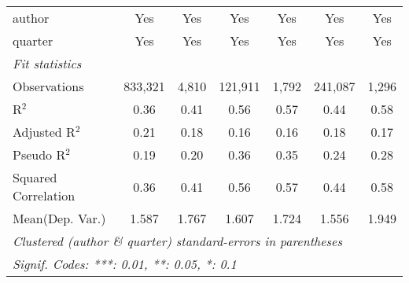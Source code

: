\begin{tabular}{lcccccc}
   author                                                     & Yes            & Yes           & Yes          & Yes         & Yes            & Yes\\  
   quarter                                                    & Yes            & Yes           & Yes          & Yes         & Yes            & Yes\\  
   \midrule
   \emph{Fit statistics}\\
   Observations                                               & 833,321        & 4,810         & 121,911      & 1,792       & 241,087        & 1,296\\  
   R$^2$                                                      & 0.36           & 0.41          & 0.56         & 0.57        & 0.44           & 0.58\\  
   Adjusted R$^2$                                             & 0.21           & 0.18          & 0.16         & 0.16        & 0.18           & 0.17\\  
   Pseudo R$^2$                                               & 0.19           & 0.20          & 0.36         & 0.35        & 0.24           & 0.28\\  
   Squared Correlation                                        & 0.36           & 0.41          & 0.56         & 0.57        & 0.44           & 0.58\\  
Mean(Dep. Var.) & 1.587 & 1.767 & 1.607 & 1.724 & 1.556 & 1.949 \\
   \midrule \midrule
   \multicolumn{7}{l}{\emph{Clustered (author \& quarter) standard-errors in parentheses}}\\
   \multicolumn{7}{l}{\emph{Signif. Codes: ***: 0.01, **: 0.05, *: 0.1}}\\
\end{tabular}
\par\endgroup
